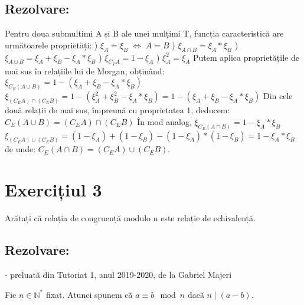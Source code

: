 \documentclass{article}
\DeclareRobustCommand\iff{\;\Longleftrightarrow\;}
\begin{document}
\subsection{Rezolvare:}
Pentru doua submultimi A și B ale unei mulțimi T, funcția caracteristică are următoarele proprietăți:
\newline
{}) $\xi_A = \xi_B \iff A=B$
) $\xi_{A\cap B} = \xi_A * \xi_B$
) $\xi_{A\cup B} = \xi_A + \xi_B - \xi_A * \xi_B$
) $\xi_{C_TA} = 1 - \xi_A$
) $\xi^2_A = \xi_A$
\newline
Putem aplica proprietățile de mai sus în relațiile lui de Morgan, obținând:
\newline
$\xi_{C_E(A\cup B)} = 1 - (\xi_A + \xi_B - \xi_A * \xi_B)$ 
\newline
$\xi_{(C_E A)\cap (C_E B)} = 1 - (\xi_A^2 + \xi_B^2 - \xi_A * \xi_B) = 1 - (\xi_A + \xi_B - \xi_A * \xi_B)$
\newline
Din cele două relații de mai sus, împreună cu proprietatea 1, deducem:
\newline
$C_E(A\cup B) = (C_E A)\cap (C_E B)$
\newline
În mod analog,
\newline
$\xi_{C_E(A\cap B)} = 1 - \xi_A * \xi_B$ 
\newline
$\xi_{(C_E A)\cup (C_E B)} = (1 - \xi_A) + (1 - \xi_B) - (1 - \xi_A) * (1 - \xi_B) =1 - \xi_A * \xi_B$
\newline
de unde:
\newline
$C_E(A\cap B) = (C_E A)\cup (C_E B)$.




\section{Exercițiul 3}
Arătați că relația de congruență modulo n este relație de echivalență.

\subsection{Rezolvare:} 
- preluată din Tutoriat 1, anul 2019-2020, de la Gabriel Majeri 

\medskip

Fie \(n \in \mathbb{N}^*\) fixat. Atunci spunem că \(a \equiv b \mod n\) dacă \(n \mid (a - b)\).
\end{document}
